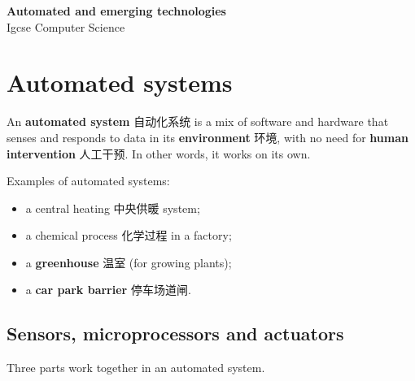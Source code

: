 \documentclass[11pt]{article}
\begin{document}
\begin{center}
  {\LARGE\bfseries Automated and emerging technologies}\\[0.35em]
  {\large Igcse Computer Science}
\end{center}
\vspace{0.6em}

\section*{Automated systems}

An \textbf{automated system} 自动化系统 is a mix of software and hardware that senses and responds to data in its \textbf{environment} 环境, with no need for \textbf{human intervention} 人工干预. In other words, it works on its own.

Examples of automated systems:

\begin{itemize}
\item a central heating 中央供暖 system;

\item a chemical process 化学过程 in a factory;

\item a \textbf{greenhouse} 温室 (for growing plants);

\item a \textbf{car park barrier} 停车场道闸.

\end{itemize}

\subsection*{Sensors, microprocessors and actuators}

Three parts work together in an automated system.

\begin{center}
\end{center}
\end{document}
